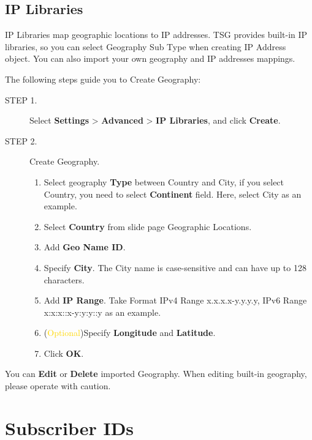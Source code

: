 \subsection*{\hypertarget{link:IP Libraries}{IP Libraries}}
\label{sec:objects:ip:library}

IP Libraries map geographic locations to IP addresses. TSG provides built-in IP libraries, so you can select Geography Sub Type when creating IP Address object. You can also import your own geography and IP addresses mappings. 


The following steps guide you to Create Geography:

\begin{description}
    \item[STEP 1.]	Select \textbf{Settings} > \textbf{Advanced} > \textbf{IP Libraries}, and click \textbf{Create}.
    \item[STEP 2.]	Create Geography. 
    \begin{enumerate} 
        \item Select geography \textbf{Type} between Country and City, if you select Country, you need to select \textbf{Continent} field. Here, select City as an example.
        \item Select \textbf{Country} from slide page Geographic Locations.
        \item Add \textbf{Geo Name ID}.
        \item Specify \textbf{City}. The City name is case-sensitive and can have up to 128 characters.
        \item Add \textbf{IP Range}. Take Format IPv4 Range x.x.x.x-y.y.y.y, IPv6 Range x:x:x::x-y:y:y::y as an example.
        \item (\textcolor{gold}{Optional})Specify \textbf{Longitude} and \textbf{Latitude}. 
        \item Click \textbf{OK}.
    \end{enumerate}  
\end{description}

You can \textbf{Edit} or \textbf{Delete} imported Geography. When editing built-in geography, please operate with caution. 

\section*{\hypertarget{link:Subscriber IDs}{Subscriber IDs}}
\label{sec:objects:subscriber}

